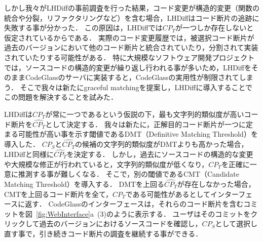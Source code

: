 しかし我々がLHDiffの事前調査を行った結果，コード変更が構造的変更（関数の統合や分裂，リファクタリングなど）を含む場合，LHDiffはコード断片の追跡に失敗する事が分かった．
この原因は，LHDiffでは$CP_T$が一つしか存在しないと仮定されているからである．
実際のコード変更履歴では，被選択コード断片が過去のバージョンにおいて他のコード断片と統合されていたり，分割されて実装されていたりする可能性がある．
特に大規模なソフトウェア開発プロジェクトでは，ソースコードの構造的変更が繰り返し行われる事が多いため，LHDiffをそのままCodeGlassのサーバに実装すると，CodeGlassの実用性が制限されてしまう．
そこで我々は新たにgraceful matchingを提案し，LHDiffに導入することでこの問題を解決することを試みた．



LHDiffは$CP_T$が常に一つであるという仮説の下，最も文字列的類似度が高いコード断片を$\widehat{CP_T}$として決定する．
我々は新たに，正解目的コード断片が一つに定まる可能性が高い事を示す閾値であるDMT（Definitive Matching Threshold）を導入した．
$CP_{S}$と$\widehat{CP_T}$の候補の文字列的類似度がDMTよりも高かった場合，LHDiffと同様に$\widehat{CP_T}$を決定する．
しかし，過去にソースコードの構造的な変更や大規模な修正が行われていると，文字列的類似度が低くなり，$CP_{T}$を正確に一意に推測する事が難しくなる．
そこで，別の閾値であるCMT（Candidate Matching Threshold）を導入する．
DMTを上回る$\widehat{CP_T}$が存在しなかった場合，CMTを上回るコード断片を全て，$CP_{T}$である可能性があるとしてインターフェースに返す．
CodeGlassのインターフェースは，それらのコード断片を含むコミットを図~\ref{fig:WebInterface}a~(3)のように表示する．
ユーザはそのコミットをクリックして過去のバージョンにおけるソースコードを確認し，$CP_S$として選択し直す事で，引き続きコード断片の調査を継続する事ができる．



